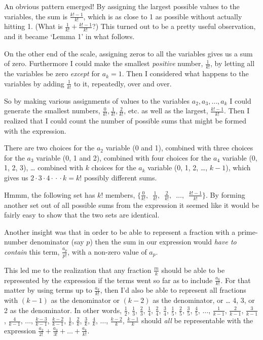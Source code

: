 \documentclass{article}
\begin{document}
An obvious pattern emerged!
By assigning the largest possible values to the variables,
the sum is \(\frac{k!-1}{k!}\),
which is as close to 1 as possible without actually
hitting 1. (What is \(\frac{1}{k!} + \frac{k!-1}{k!}\)?)
This turned out to be
a pretty useful observation, and it became `Lemma 1' in what follows.

On the other end of the scale, assigning zeros to all the variables 
gives us a sum of zero.
Furthermore
I could make
the smallest \emph{positive} number, \(\frac{1}{k!}\), by
letting all the variables be zero \emph{except} for \(a_k = 1\).
Then I considered what happens to the variables by
adding \(\frac{1}{k!}\) to it, repeatedly, over and over.

So by making various assignments of values to
the variables \(a_2, a_3, \dots{}, a_k\) I could
generate the smallest numbers, \(\frac{0}{k!}, \frac{1}{k!}, \frac{2}{k!}\), etc.
as well as the largest,
\(\frac{k!-1}{k!}\).
Then I realized that I could count the number of possible sums that might be formed 
with the expression.

There are two choices for the \(a_2\) variable (0 and 1),
combined with three choices for the \(a_3\) variable (0, 1 and 2),
combined with four choices for the \(a_4\) variable (0, 1, 2, 3),
\dots{} combined with \(k\) choices for
the \(a_k\) variable (0, 1, 2, \dots{}, \(k\!-\!1\)), which
gives us \(2\cdot{}3\cdot{}4\cdot{}\cdot{}\cdot{}k = k!\) possibly different sums.

Hmmm, the following set has \(k!\) members,
\(\{\frac{0}{k!},\enspace \frac{1}{k!},\enspace \frac{2}{k!},
\enspace \dots{},\enspace \frac{k!-1}{k!}\}\).
By forming another set out of all possible sums from the expression
it seemed like it would be fairly easy to show that the two sets are identical.

Another insight was that in order to be able to represent
a fraction with a prime-number denominator (say \(p\))
then the sum in our
expression would \emph{have to contain} this term,
\(\frac{a_p}{p!}\),
with a non-zero value of \(a_p\).

This led me to the realization that any fraction \(\frac{m}{k}\)
should be able to be represented by the expression
if the terms went so far as to include \(\frac{a_k}{k!}\). For that
matter by using terms up to \(\frac{a_k}{k!}\), then I'd
also be able to represent all fractions with
\((k-1)\) as the denominator or 
\((k-2)\) as the denominator, or \dots{}
4, 3, or 2 as the denominator. In other words,
\(\frac{1}{2}\),
\(\frac{1}{3}\),
\(\frac{2}{3}\),
\(\frac{1}{4}\),
\(\frac{2}{4}\),
\(\frac{3}{4}\),
\(\frac{1}{5}\),
\(\frac{2}{5}\),
\(\frac{3}{5}\),
\(\frac{4}{5}\),
\(\dots{}\),
\(\frac{1}{k-1}\),
\(\frac{2}{k-1}\),
\(\frac{3}{k-1}\),
\(\frac{4}{k-1}\),
\(\dots{}\),
\(\frac{k-3}{k-1}\),
\(\frac{k-2}{k-1}\),
\(\frac{1}{k}\),
\(\frac{2}{k}\),
\(\frac{3}{k}\),
\(\frac{4}{k}\),
\(\dots{}\),
\(\frac{k-2}{k}\),
\(\frac{k-1}{k}\)
should \emph{all} be
representable with the expression 
\(\frac{a_2}{2!} + \frac{a_3}{3!} + \dots{} + \frac{a_k}{k!}\). 
\end{document}
